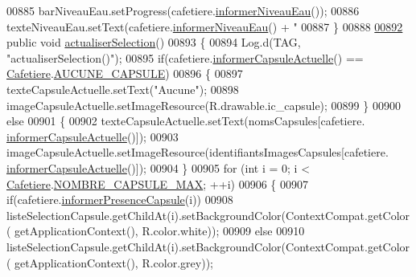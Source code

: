 \begin{DoxyCode}
00885         barNiveauEau.setProgress(cafetiere.\hyperlink{classcom_1_1example_1_1ekawa_1_1_cafetiere_ab8113e922056276f8097744991ca76b6}{informerNiveauEau}());
00886         texteNiveauEau.setText(cafetiere.\hyperlink{classcom_1_1example_1_1ekawa_1_1_cafetiere_ab8113e922056276f8097744991ca76b6}{informerNiveauEau}() + \textcolor{stringliteral}{"%
00887     \}
00888 
\hyperlink{classcom_1_1example_1_1ekawa_1_1_ihm_a2d7fd2fe397785acc2b9a32e65cfd52f}{00892}     \textcolor{keyword}{public} \textcolor{keywordtype}{void} \hyperlink{classcom_1_1example_1_1ekawa_1_1_ihm_a2d7fd2fe397785acc2b9a32e65cfd52f}{actualiserSelection}()
00893     \{
00894         Log.d(TAG, \textcolor{stringliteral}{"actualiserSelection()"});
00895         \textcolor{keywordflow}{if}(cafetiere.\hyperlink{classcom_1_1example_1_1ekawa_1_1_cafetiere_a3251d1865f3a4113553e1743a971984d}{informerCapsuleActuelle}() == 
      \hyperlink{classcom_1_1example_1_1ekawa_1_1_cafetiere}{Cafetiere}.\hyperlink{classcom_1_1example_1_1ekawa_1_1_cafetiere_a5a23a636fa5f2e5826458e700f453c16}{AUCUNE\_CAPSULE})
00896         \{
00897             texteCapsuleActuelle.setText(\textcolor{stringliteral}{"Aucune"});
00898             imageCapsuleActuelle.setImageResource(R.drawable.ic\_capsule);
00899         \}
00900         \textcolor{keywordflow}{else}
00901         \{
00902             texteCapsuleActuelle.setText(nomsCapsules[cafetiere.
      \hyperlink{classcom_1_1example_1_1ekawa_1_1_cafetiere_a3251d1865f3a4113553e1743a971984d}{informerCapsuleActuelle}()]);
00903             imageCapsuleActuelle.setImageResource(identifiantsImagesCapsules[cafetiere.
      \hyperlink{classcom_1_1example_1_1ekawa_1_1_cafetiere_a3251d1865f3a4113553e1743a971984d}{informerCapsuleActuelle}()]);
00904         \}
00905         \textcolor{keywordflow}{for} (\textcolor{keywordtype}{int} i = 0; i < \hyperlink{classcom_1_1example_1_1ekawa_1_1_cafetiere}{Cafetiere}.\hyperlink{classcom_1_1example_1_1ekawa_1_1_cafetiere_a183d96e89c056c4ac9c565bf8f24851e}{NOMBRE\_CAPSULE\_MAX}; ++i)
00906         \{
00907             \textcolor{keywordflow}{if}(cafetiere.\hyperlink{classcom_1_1example_1_1ekawa_1_1_cafetiere_a35a291f849346b374f63324bc3ecd70b}{informerPresenceCapsule}(i))
00908                 listeSelectionCapsule.getChildAt(i).setBackgroundColor(ContextCompat.getColor(
      getApplicationContext(), R.color.white));
00909             \textcolor{keywordflow}{else}
00910                 listeSelectionCapsule.getChildAt(i).setBackgroundColor(ContextCompat.getColor(
      getApplicationContext(), R.color.grey));
}
\end{DoxyCode}
